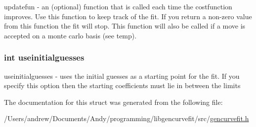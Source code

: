 \label{structgencurvefit_options_ae8dada41d1098787c320af40b0320412}
updatefun -\/ an (optional) function that is called each time the costfunction improves. Use this function to keep track of the fit. If you return a non-\/zero value from this function the fit will stop. This function will also be called if a move is accepted on a monte carlo basis (see temp). \hypertarget{structgencurvefit_options_af99f3583d5d6789c1aa1e9bf02f4c61c}{
\subsubsection[{useinitialguesses}]{\setlength{\rightskip}{0pt plus 5cm}int {\bf useinitialguesses}}}
\label{structgencurvefit_options_af99f3583d5d6789c1aa1e9bf02f4c61c}
useinitialguesses -\/ uses the initial guesses as a starting point for the fit. If you specify this option then the starting coefficients must lie in between the limits 

The documentation for this struct was generated from the following file:\begin{DoxyCompactItemize}
\item 
/Users/andrew/Documents/Andy/programming/libgencurvefit/src/\hyperlink{gencurvefit_8h}{gencurvefit.h}\end{DoxyCompactItemize}
